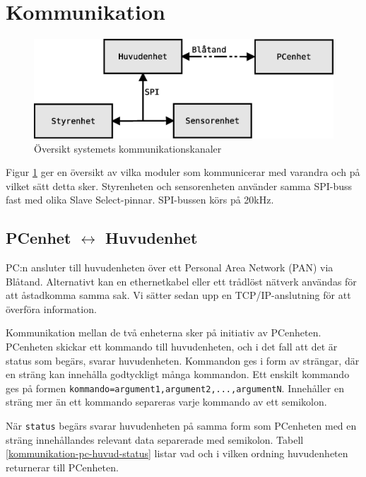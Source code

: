 \section{Kommunikation}

\begin{figure}[h!]
	\centering
	\includegraphics[scale=0.4]{grafik/kommunikation-oversikt}
	\caption{Översikt systemets kommunikationskanaler} \label{kommunikation-oversikt}
\end{figure}

Figur \ref{kommunikation-oversikt} ger en översikt av vilka moduler som kommunicerar med varandra och på vilket sätt detta sker. Styrenheten och sensorenheten använder samma SPI-buss\cite{SPI} fast med olika Slave Select-pinnar. SPI-bussen körs på 20kHz.

\subsection{PCenhet $\longleftrightarrow$ Huvudenhet}

PC:n ansluter till huvudenheten över ett Personal Area Network (PAN) via Blåtand. Alternativt kan en ethernetkabel eller ett trådlöst nätverk användas för att åstadkomma samma sak. Vi sätter sedan upp en TCP/IP-anslutning för att överföra information.

Kommunikation mellan de två enheterna sker på initiativ av PCenheten. PCenheten skickar ett kommando till huvudenheten, och i det fall att det är status som begärs, svarar huvudenheten. Kommandon ges i form av strängar, där en sträng kan innehålla godtyckligt många kommandon. Ett enskilt kommando ges på formen \texttt{kommando=argument1,argument2,...,argumentN}. Innehåller en sträng mer än ett kommando separeras varje kommando av ett semikolon.

När \texttt{status} begärs svarar huvudenheten på samma form som PCenheten med en sträng innehållandes relevant data separerade med semikolon. Tabell \ref{kommunikation-pc-huvud-status} listar vad och i vilken ordning huvudenheten returnerar till PCenheten.

